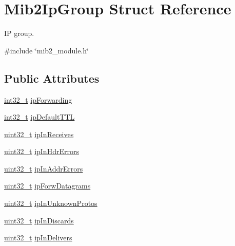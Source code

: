 \hypertarget{structMib2IpGroup}{}\section{Mib2\+Ip\+Group Struct Reference}
\label{structMib2IpGroup}


IP group.  




{\ttfamily \#include \char`\"{}mib2\+\_\+module.\+h\char`\"{}}

\subsection*{Public Attributes}
\begin{DoxyCompactItemize}
\item 
\hyperlink{stdint_8h_ab1967d8591af1a4e48c37fd2b0f184d0}{int32\+\_\+t} \hyperlink{structMib2IpGroup_a91e59ed02859f710b194000b28c1ac5a}{ip\+Forwarding}
\item 
\hyperlink{stdint_8h_ab1967d8591af1a4e48c37fd2b0f184d0}{int32\+\_\+t} \hyperlink{structMib2IpGroup_a3c4796d6fbe05b13db61909730b459af}{ip\+Default\+T\+TL}
\item 
\hyperlink{stdint_8h_a435d1572bf3f880d55459d9805097f62}{uint32\+\_\+t} \hyperlink{structMib2IpGroup_a9938034ea51258423ec11ea50dbbd48c}{ip\+In\+Receives}
\item 
\hyperlink{stdint_8h_a435d1572bf3f880d55459d9805097f62}{uint32\+\_\+t} \hyperlink{structMib2IpGroup_a285d1d760299825dff75d284e4d3ed4f}{ip\+In\+Hdr\+Errors}
\item 
\hyperlink{stdint_8h_a435d1572bf3f880d55459d9805097f62}{uint32\+\_\+t} \hyperlink{structMib2IpGroup_a212414037c79f821f7f4f763f0a3df64}{ip\+In\+Addr\+Errors}
\item 
\hyperlink{stdint_8h_a435d1572bf3f880d55459d9805097f62}{uint32\+\_\+t} \hyperlink{structMib2IpGroup_a73ac7171cf35d4c41223b97d585c73e6}{ip\+Forw\+Datagrams}
\item 
\hyperlink{stdint_8h_a435d1572bf3f880d55459d9805097f62}{uint32\+\_\+t} \hyperlink{structMib2IpGroup_a9619ca18408c9f456ef26a2dd51c9a40}{ip\+In\+Unknown\+Protos}
\item 
\hyperlink{stdint_8h_a435d1572bf3f880d55459d9805097f62}{uint32\+\_\+t} \hyperlink{structMib2IpGroup_afd2fbb3fe7000314606d7e44c0b9e97b}{ip\+In\+Discards}
\item 
\hyperlink{stdint_8h_a435d1572bf3f880d55459d9805097f62}{uint32\+\_\+t} \hyperlink{structMib2IpGroup_a3089df3fe15272634eaf7e736f411eb9}{ip\+In\+Delivers}

\end{DoxyCompactItemize}
